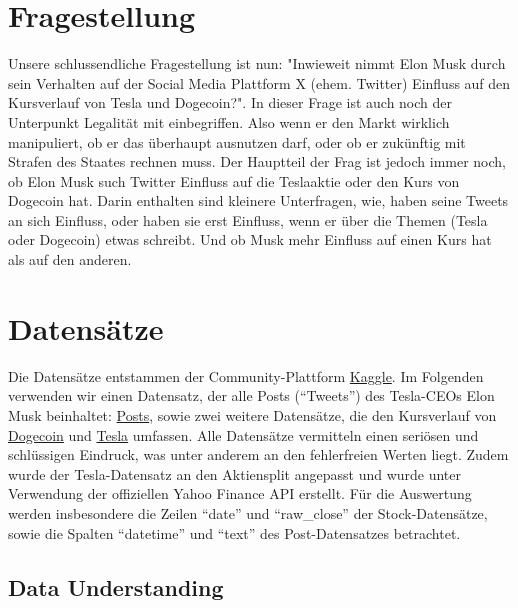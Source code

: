 \documentclass{article}
\begin{document}
\section{Fragestellung}
Unsere schlussendliche Fragestellung ist nun: "Inwieweit nimmt Elon Musk durch sein Verhalten auf der Social Media Plattform X (ehem. Twitter) Einfluss auf den Kursverlauf von Tesla und Dogecoin?". In dieser Frage ist auch noch der Unterpunkt Legalität mit einbegriffen. Also wenn er den Markt wirklich manipuliert, ob er das überhaupt ausnutzen darf, oder ob er zukünftig mit Strafen des Staates rechnen muss. Der Hauptteil der Frag ist jedoch immer noch, ob Elon Musk such Twitter Einfluss auf die Teslaaktie oder den Kurs von Dogecoin hat. Darin enthalten sind kleinere Unterfragen, wie, haben seine Tweets an sich Einfluss, oder haben sie erst Einfluss, wenn er über die Themen (Tesla oder Dogecoin) etwas schreibt. Und ob Musk mehr Einfluss auf einen Kurs hat als auf den anderen. 



\section{Datensätze}
Die Datensätze entstammen der Community-Plattform \href{https://www.kaggle.com/datasets/dhruvildave/dogecoin-historical-data}{Kaggle}.
Im Folgenden verwenden wir einen Datensatz, der alle Posts (``Tweets'') des Tesla-CEOs Elon Musk  beinhaltet: \href{https://www.kaggle.com/datasets/aryansingh0909/elon-musk-tweets-updated-daily}{Posts}, sowie zwei weitere Datensätze, die den Kursverlauf von \href{https://www.kaggle.com/datasets/dhruvildave/dogecoin-historical-datay}{Dogecoin} und \href{https://www.kaggle.com/datasets/dhruvildave/dogecoin-historical-datay}{Tesla} umfassen.
Alle Datensätze vermitteln einen seriösen und schlüssigen Eindruck, was unter anderem an den fehlerfreien Werten liegt.
Zudem wurde der Tesla-Datensatz an den Aktiensplit angepasst und wurde unter Verwendung der offiziellen Yahoo Finance API erstellt.
Für die Auswertung werden insbesondere die Zeilen ``date'' und ``raw\_close'' der Stock-Datensätze, sowie die Spalten ``datetime'' und ``text'' des Post-Datensatzes betrachtet.

\subsection{Data Understanding}
\end{document}
